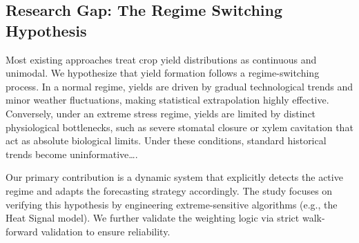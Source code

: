 \subsection{Research Gap: The Regime Switching Hypothesis}
Most existing approaches treat crop yield distributions as continuous and unimodal. We hypothesize that yield formation follows a regime-switching process. In a normal regime, yields are driven by gradual technological trends and minor weather fluctuations, making statistical extrapolation highly effective. Conversely, under an extreme stress regime, yields are limited by distinct physiological bottlenecks, such as severe stomatal closure or xylem cavitation that act as absolute biological limits. Under these conditions, standard historical trends become uninformative\ldots.

Our primary contribution is a dynamic system that explicitly detects the active regime and adapts the forecasting strategy accordingly. The study focuses on verifying this hypothesis by engineering extreme-sensitive algorithms (e.g., the Heat Signal model). We further validate the weighting logic via strict walk-forward validation to ensure reliability.